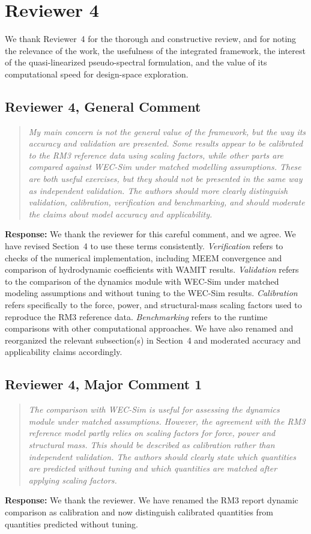 \documentclass[11pt]{article}
\newcommand{\rcomment}[2]{\subsection*{#1}\begin{quote}\itshape #2\end{quote}}
\newcommand{\response}{\noindent\textbf{Response:} }
\begin{document}
\clearpage
\section*{Reviewer 4}

We thank Reviewer~4 for the thorough and constructive review, and for noting the relevance of the work, the usefulness of the integrated framework, the interest of the quasi-linearized pseudo-spectral formulation, and the value of its computational speed for design-space exploration.

\rcomment{Reviewer 4, General Comment}{My main concern is not the general value of the framework, but the way its accuracy and validation are presented. Some results appear to be calibrated to the RM3 reference data using scaling factors, while other parts are compared against WEC-Sim under matched modelling assumptions. These are both useful exercises, but they should not be presented in the same way as independent validation. The authors should more clearly distinguish validation, calibration, verification and benchmarking, and should moderate the claims about model accuracy and applicability.}
\response We thank the reviewer for this careful comment, and we agree. We have revised Section~4 to use these terms consistently. \textit{Verification} refers to checks of the numerical implementation, including MEEM convergence and comparison of hydrodynamic coefficients with WAMIT results. \textit{Validation} refers to the comparison of the dynamics module with WEC-Sim under matched modeling assumptions and without tuning to the WEC-Sim results. \textit{Calibration} refers specifically to the force, power, and structural-mass scaling factors used to reproduce the RM3 reference data. \textit{Benchmarking} refers to the runtime comparisons with other computational approaches. We have also renamed and reorganized the relevant subsection(s) in Section~4 and moderated accuracy and applicability claims accordingly.

\rcomment{Reviewer 4, Major Comment 1}{The comparison with WEC-Sim is useful for assessing the dynamics module under matched assumptions. However, the agreement with the RM3 reference model partly relies on scaling factors for force, power and structural mass. This should be described as calibration rather than independent validation. The authors should clearly state which quantities are predicted without tuning and which quantities are matched after applying scaling factors.}
\response We thank the reviewer.
We have renamed the RM3 report dynamic comparison as calibration and now distinguish calibrated quantities from quantities predicted without tuning.
\end{document}
